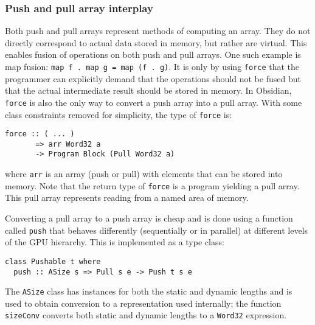\subsubsection{Push and pull array interplay} 
\label{sec:interplay}

Both push and pull arrays represent methods of computing an array. They 
do not directly correspond to actual data stored in memory, but rather 
are virtual. This enables fusion of operations on both push and pull arrays. 
One such example is map fusion: \verb!map f . map g = map (f . g)!. It is 
only by using {\tt force} that the programmer can explicitly demand that the 
operations should not be fused but that the actual intermediate result should 
be stored in memory. In Obsidian, {\tt force} is also the only way 
to convert a push array into a pull array. 
With some class constraints removed for simplicity, the type of {\tt force} is: 
\begin{small} 
\begin{Verbatim}[samepage=true] 
force :: ( ... ) 
       => arr Word32 a 
       -> Program Block (Pull Word32 a)
\end{Verbatim}
\end{small}

\noindent
where {\tt arr} is an array (push or pull) with elements that can be stored into memory. 
Note that the return type of {\tt force} is a program yielding a pull array. This pull 
array represents reading from a named area of memory. 

Converting a pull array to a push array is cheap and is done using a function called 
{\tt push} that behaves differently (sequentially or in parallel) at different levels
of the GPU hierarchy. This is implemented as a type class: 

\begin{small}
\begin{Verbatim}[samepage=true] 
class Pushable t where
  push :: ASize s => Pull s e -> Push t s e 
\end{Verbatim} 
\end{small}  

The {\tt ASize} class has instances for both the static and dynamic lengths 
and is used to obtain conversion to a representation used internally; 
the function {\tt sizeConv} converts both static and dynamic lengths to a {\tt Word32} expression.

